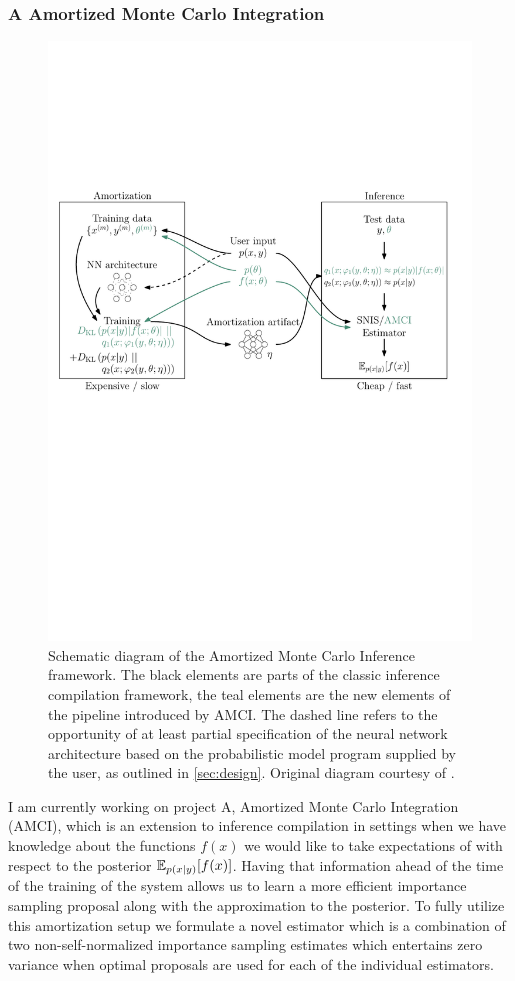 \documentclass[12pt]{article}
\begin{document}
\subsubsection*{A \quad Amortized Monte Carlo Integration}
\begin{figure}[H]
  \centering
  \includegraphics[width=0.8\linewidth]{figures/diagram.pdf}
  \caption{
  Schematic diagram of the Amortized Monte Carlo Inference framework.
  The black elements are parts of the classic inference compilation framework,
  the teal elements are the new elements of the pipeline introduced by AMCI.
  The dashed line refers to the opportunity of at least partial specification of the neural network architecture based on the probabilistic model program supplied by the user, as outlined in \autoref{sec:design}. 
  Original diagram courtesy of \citet{LeEtAl2016}.}
  \label{fig:amci}
\end{figure}
I am currently working on project A, Amortized Monte Carlo Integration (AMCI), which is an extension to inference compilation in settings when we have knowledge about the functions $f(x)$ we would like to take expectations of with respect to the posterior $\mathbb{E}_{p(x|y)}[f(x)]$.
Having that information ahead of the time of the training of the system allows us to learn a more efficient importance sampling proposal along with the approximation to the posterior.
To fully utilize this amortization setup we formulate a novel estimator which is a combination of two non-self-normalized importance sampling estimates which entertains zero variance when optimal proposals are used for each of the individual estimators.
\end{document}
